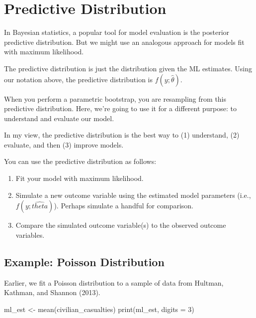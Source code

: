 \documentclass[
]{book}
\newenvironment{Shaded}{\begin{snugshade}}{\end{snugshade}}
\newcommand{\AttributeTok}[1]{\textcolor[rgb]{0.77,0.63,0.00}{#1}}
\newcommand{\DecValTok}[1]{\textcolor[rgb]{0.00,0.00,0.81}{#1}}
\newcommand{\FunctionTok}[1]{\textcolor[rgb]{0.00,0.00,0.00}{#1}}
\newcommand{\NormalTok}[1]{#1}
\newcommand{\OtherTok}[1]{\textcolor[rgb]{0.56,0.35,0.01}{#1}}
\providecommand{\tightlist}{%
  \setlength{\itemsep}{0pt}\setlength{\parskip}{0pt}}
\begin{document}
\hypertarget{predictive-distribution}{%
\section{Predictive Distribution}\label{predictive-distribution}}

In Bayesian statistics, a popular tool for model evaluation is the posterior predictive distribution. But we might use an analogous approach for models fit with maximum likelihood.

The predictive distribution is just the distribution given the ML estimates. Using our notation above, the predictive distribution is \(f(y; \hat{\theta})\).

When you perform a parametric bootstrap, you are resampling from this predictive distribution. Here, we're going to use it for a different purpose: to understand and evaluate our model.

In my view, the predictive distribution is the best way to (1) understand, (2) evaluate, and then (3) improve models.

You can use the predictive distribution as follows:

\begin{enumerate}
\def\labelenumi{\arabic{enumi}.}
\tightlist
\item
  Fit your model with maximum likelihood.
\item
  Simulate a new outcome variable using the estimated model parameters (i.e., \(f(y; \hat{theta})\)). Perhaps simulate a handful for comparison.
\item
  Compare the simulated outcome variable(s) to the observed outcome variables.
\end{enumerate}

\hypertarget{example-poisson-distribution-2}{%
\subsection{Example: Poisson Distribution}\label{example-poisson-distribution-2}}

Earlier, we fit a Poisson distribution to a sample of data from Hultman, Kathman, and Shannon (2013).

\begin{Shaded}
\begin{Highlighting}[]
\NormalTok{ml\_est }\OtherTok{\textless{}{-}} \FunctionTok{mean}\NormalTok{(civilian\_casualties)}
\FunctionTok{print}\NormalTok{(ml\_est, }\AttributeTok{digits =} \DecValTok{3}\NormalTok{)}
\end{Highlighting}
\end{Shaded}
\end{document}
